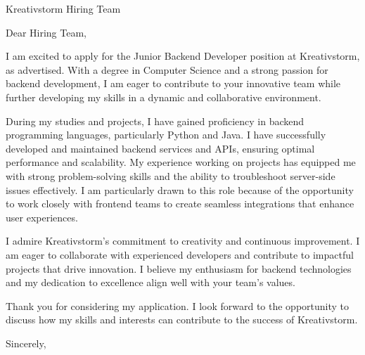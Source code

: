 \documentclass[a4paper,10pt]{letter}
\date{\today}
\begin{document}
\begin{letter}{Kreativstorm Hiring Team}

\opening{Dear Hiring Team,}

I am excited to apply for the Junior Backend Developer position at Kreativstorm, as advertised. With a degree in Computer Science and a strong passion for backend development, I am eager to contribute to your innovative team while further developing my skills in a dynamic and collaborative environment.

During my studies and projects, I have gained proficiency in backend programming languages, particularly Python and Java. I have successfully developed and maintained backend services and APIs, ensuring optimal performance and scalability. My experience working on projects has equipped me with strong problem-solving skills and the ability to troubleshoot server-side issues effectively. I am particularly drawn to this role because of the opportunity to work closely with frontend teams to create seamless integrations that enhance user experiences.

I admire Kreativstorm’s commitment to creativity and continuous improvement. I am eager to collaborate with experienced developers and contribute to impactful projects that drive innovation. I believe my enthusiasm for backend technologies and my dedication to excellence align well with your team’s values.

Thank you for considering my application. I look forward to the opportunity to discuss how my skills and interests can contribute to the success of Kreativstorm.

\closing{Sincerely,}

\end{letter}
\end{document}
